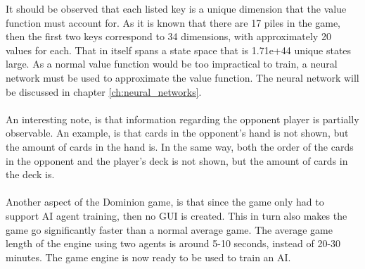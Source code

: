 It should be observed that each listed key is a unique dimension that the value function must account for. As it is known that there are 17 piles in the game, then the first two keys correspond to 34 dimensions, with approximately 20 values for each. That in itself spans a state space that is 1.71e+44 unique states large. As a normal value function would be too impractical to train, a neural network must be used to approximate the value function. The neural network will be discussed in chapter \ref{ch:neural_networks}.\\\\

An interesting note, is that information regarding the opponent player is partially observable. An example, is that cards in the opponent's hand is not shown, but the amount of cards in the hand is. In the same way, both the order of the cards in the opponent and the player's deck is not shown, but the amount of cards in the deck is.\\\\
Another aspect of the Dominion game, is that since the game only had to support AI agent training, then no GUI is created. This in turn also makes the game go significantly faster than a normal average game. The average game length of the engine using two agents is around 5-10 seconds, instead of 20-30 minutes. The game engine is now ready to be used to train an AI.